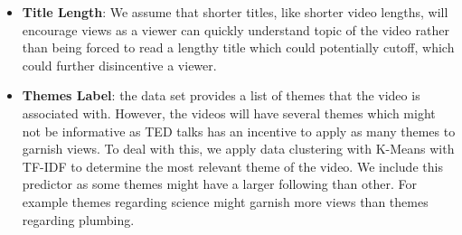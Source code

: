 \begin{itemize}
	\item \textbf{Title Length}: We assume that shorter titles, like shorter video lengths, will encourage views as a viewer can quickly understand topic of the video rather than being forced to read  a lengthy title which could potentially cutoff, which could further disincentive a viewer.
	\item \textbf{Themes Label}: the data set provides a list of themes that the video is associated with. However, the videos will have several themes which might not be informative as TED talks has an incentive to apply as many themes to garnish views. To deal with this, we apply data clustering with K-Means with TF-IDF to determine the most relevant theme of the video. We include this predictor as some themes might have a larger following than other. For example themes regarding science might garnish more views than themes regarding plumbing.
\end{itemize}
















